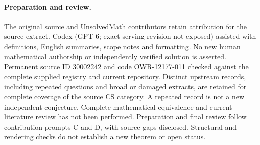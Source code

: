 \documentclass[11pt]{article}
\begin{document}
\paragraph{Preparation and review.}
The original source and UnsolvedMath contributors retain attribution for the source extract. Codex (GPT-6; exact serving revision not exposed) assisted with definitions, English summaries, scope notes and formatting. No new human mathematical authorship or independently verified solution is asserted. Permanent source ID 30002242 and code OWR-12177-011 checked against the complete supplied registry and current repository. Distinct upstream records, including repeated questions and broad or damaged extracts, are retained for complete coverage of the source CS category. A repeated record is not a new independent conjecture. Complete mathematical-equivalence and current-literature review has not been performed. Preparation and final review follow contribution prompts C and D, with source gaps disclosed. Structural and rendering checks do not establish a new theorem or open status.
\label{end:30002242}
\end{document}
